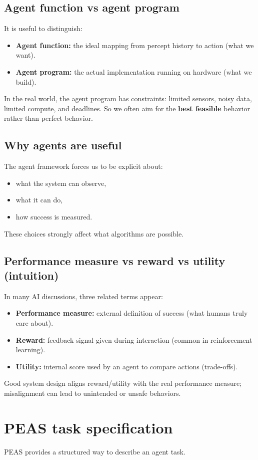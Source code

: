 \documentclass[11pt]{article}
\begin{document}
\subsection{Agent function vs agent program}
It is useful to distinguish:
\begin{itemize}[leftmargin=*]
  \item \textbf{Agent function:} the ideal mapping from percept history to action (what we want).
  \item \textbf{Agent program:} the actual implementation running on hardware (what we build).
\end{itemize}
In the real world, the agent program has constraints: limited sensors, noisy data, limited compute, and deadlines. So we often aim for the \textbf{best feasible} behavior rather than perfect behavior.

\subsection{Why agents are useful}
The agent framework forces us to be explicit about:
\begin{itemize}[leftmargin=*]
  \item what the system can observe,
  \item what it can do,
  \item how success is measured.
\end{itemize}
These choices strongly affect what algorithms are possible.

\subsection{Performance measure vs reward vs utility (intuition)}
In many AI discussions, three related terms appear:
\begin{itemize}[leftmargin=*]
  \item \textbf{Performance measure:} external definition of success (what humans truly care about).
  \item \textbf{Reward:} feedback signal given during interaction (common in reinforcement learning).
  \item \textbf{Utility:} internal score used by an agent to compare actions (trade-offs).
\end{itemize}
Good system design aligns reward/utility with the real performance measure; misalignment can lead to unintended or unsafe behaviors.

\section{PEAS task specification}
PEAS provides a structured way to describe an agent task.
\end{document}
